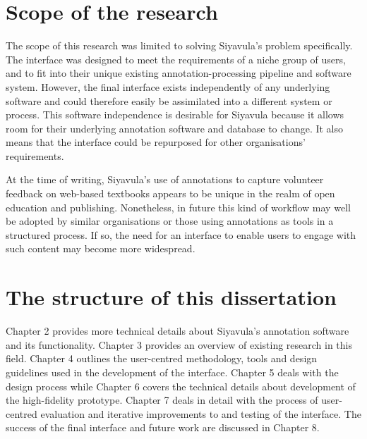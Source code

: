 \section{Scope of the research}
The scope of this research was limited to solving Siyavula's problem specifically. The interface was designed to meet the requirements of a niche group of users, and to fit into their unique existing annotation-processing pipeline and software system. However, the final interface exists independently of any underlying software and could therefore easily be assimilated into a different system or process. This software independence is desirable for Siyavula because it allows room for their underlying annotation software and database to change. It also means that the interface could be repurposed for other organisations' requirements.

At the time of writing, Siyavula's use of annotations to capture volunteer feedback on web-based textbooks appears to be unique in the realm of open education and publishing. Nonetheless, in future this kind of workflow may well be adopted by similar organisations or those using annotations as tools in a structured process. If so, the need for an interface to enable users to engage with such content may become more widespread. 


\section{The structure of this dissertation}

Chapter 2 provides more technical details about Siyavula's annotation software and its functionality. Chapter 3 provides an overview of existing research in this field. Chapter 4 outlines the user-centred methodology, tools and design guidelines used in the development of the interface. Chapter 5 deals with the design process while Chapter 6 covers the technical details about development of the high-fidelity prototype. Chapter 7 deals in detail with the process of user-centred evaluation and iterative improvements to and testing of the interface. The success of the final interface and future work are discussed in Chapter 8.   
